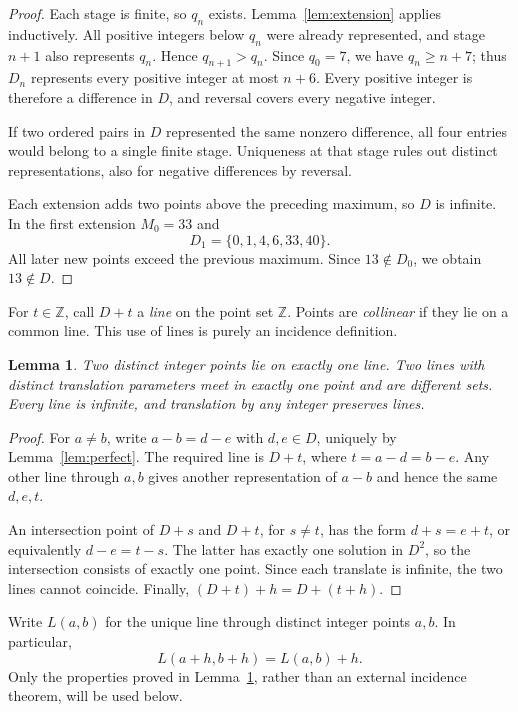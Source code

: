 \documentclass[11pt]{article}
\newtheorem{lemma}[theorem]{Lemma}
\theoremstyle{remark}
\newcommand{\Z}{\mathbb Z}
\begin{document}
\begin{proof}
Each stage is finite, so $q_n$ exists. Lemma~\ref{lem:extension} applies
inductively. All positive integers below $q_n$ were already represented,
and stage $n+1$ also represents $q_n$. Hence $q_{n+1}>q_n$.
Since $q_0=7$, we have $q_n\ge n+7$; thus $D_n$ represents every
positive integer at most $n+6$. Every positive integer is therefore a
difference in $D$, and reversal covers every negative integer.

If two ordered pairs in $D$ represented the same nonzero difference,
all four entries would belong to a single finite stage. Uniqueness at
that stage rules out distinct representations, also for negative
differences by reversal.

Each extension adds two points above the preceding maximum, so $D$ is
infinite. In the first extension $M_0=33$ and
\[
 D_1=\{0,1,4,6,33,40\}.
\]
All later new points exceed the previous maximum. Since $13\notin D_0$,
we obtain $13\notin D$.
\end{proof}

For $t\in\Z$, call $D+t$ a \emph{line} on the point set $\Z$.
Points are \emph{collinear} if they lie on a common line.
This use of lines is purely an incidence definition.

\begin{lemma}\label{lem:incidence}
Two distinct integer points lie on exactly one line. Two lines with
distinct translation parameters meet in exactly one point and are
different sets. Every line is infinite, and translation by any integer
preserves lines.
\end{lemma}

\begin{proof}
For $a\ne b$, write $a-b=d-e$ with $d,e\in D$, uniquely by
Lemma~\ref{lem:perfect}. The required line is $D+t$, where
$t=a-d=b-e$. Any other line through $a,b$ gives another representation
of $a-b$ and hence the same $d,e,t$.

An intersection point of $D+s$ and $D+t$, for $s\ne t$, has the form
$d+s=e+t$, or equivalently $d-e=t-s$. The latter has exactly one
solution in $D^2$, so the intersection consists of exactly one point.
Since each translate is infinite, the two lines cannot coincide.
Finally, $(D+t)+h=D+(t+h)$.
\end{proof}

Write $L(a,b)$ for the unique line through distinct integer points
$a,b$. In particular,
\begin{equation}\label{eq:translation}
 L(a+h,b+h)=L(a,b)+h.
\end{equation}
Only the properties proved in Lemma~\ref{lem:incidence}, rather than an
external incidence theorem, will be used below.
\end{document}
